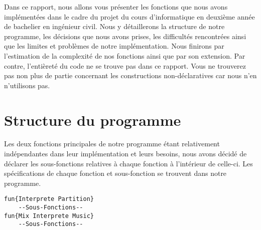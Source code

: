 \documentclass[a4paper,12pt]{report}
\begin{document}


\vspace*{5cm}
Dans ce rapport, nous allons vous présenter les fonctions que nous avons implémentées dans le cadre du projet du cours d'informatique en deuxième année de bachelier en ingénieur civil. Nous y détaillerons la structure de notre programme, les décisions que nous avons prises, les difficultés rencontrées ainsi que les limites et problèmes de notre implémentation. Nous finirons par l'estimation de la complexité de nos fonctions ainsi que par son extension. Par contre, l'entièreté du code ne se trouve pas dans ce rapport. Vous ne trouverez pas non plus de partie concernant les constructions non-déclaratives car nous n'en n'utilisons pas.

\section*{Structure du programme}
Les deux fonctions principales de notre programme étant relativement indépendantes dans leur implémentation et leurs besoins, nous avons décidé de déclarer les sous-fonctions relatives à chaque fonction à l'intérieur de celle-ci.
Les spécifications de chaque fonction et sous-fonction se trouvent dans notre programme.

\begin{lstlisting}[frame=single] 
fun{Interprete Partition}
	--Sous-Fonctions--
fun{Mix Interprete Music}
	--Sous-Fonctions--
\end{lstlisting}
\newpage
\end{document}

